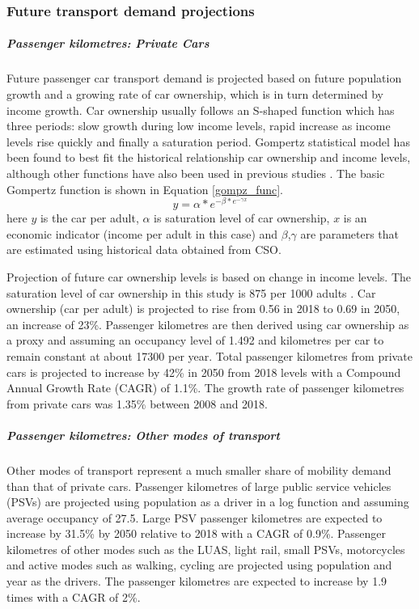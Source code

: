 \documentclass[journal abbreviation, manuscript]{copernicus}
\begin{document}
\subsubsection{Future transport demand projections}
\subparagraph{Passenger kilometres: Private Cars}
Future passenger car transport demand is projected based on future population growth and a growing rate of car ownership, which is in turn determined by income growth. Car ownership usually follows an S-shaped function which has three periods: slow growth during low income levels, rapid increase as income levels rise quickly and finally a saturation period. Gompertz statistical model has been found to best fit the historical relationship car ownership and income levels, although other functions have also been used in previous studies \citep{Lian2018}. The basic Gompertz function is shown in Equation \ref{gompz_func}.
\begin{equation}
\label{gompz_func}
 y=\alpha*e^{-\beta*e^{-\gamma x}}
\end{equation}
here $y$ is the car per adult, $\alpha$ is saturation level of car ownership, $x$ is an economic indicator (income per adult in this case) and $\beta$,$\gamma$ are parameters that are estimated using historical data obtained from CSO. 

Projection of future car ownership levels is based on change in income levels. The saturation level of car ownership in this study is 875 per 1000 adults \citep{AECOMIrelandLimited2019}. Car ownership (car per adult) is projected to rise from 0.56 in 2018 to 0.69 in 2050, an increase of 23\%. Passenger kilometres are then derived using car ownership as a proxy and assuming an occupancy level of 1.492 and kilometres per car to remain constant at about 17300 per year. Total passenger kilometres from private cars is projected to increase by 42\% in 2050 from 2018 levels with a Compound Annual Growth Rate (CAGR) of 1.1\%. The growth rate of passenger kilometres from private cars was 1.35\% between 2008 and 2018. 

\subparagraph{Passenger kilometres: Other modes of transport}
Other modes of transport represent a much smaller share of mobility demand than that of private cars. Passenger kilometres of large public service vehicles (PSVs) are projected using population as a driver in a log function and assuming average occupancy of 27.5. Large PSV passenger kilometres are expected to increase by 31.5\% by 2050 relative to 2018 with a CAGR of 0.9\%. Passenger kilometres of other modes such as the LUAS, light rail, small PSVs, motorcycles and active modes such as walking, cycling are projected using population and year as the drivers. The passenger kilometres are expected to increase by 1.9 times with a CAGR of 2\%. 
\end{document}
